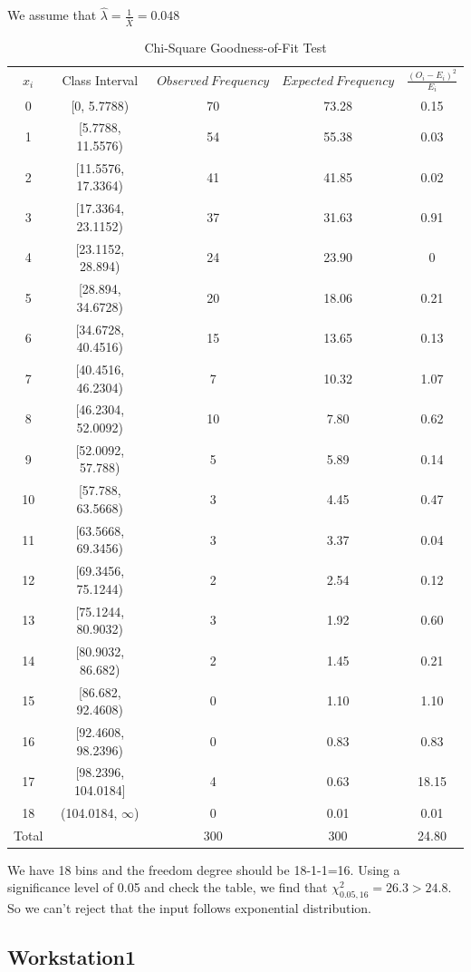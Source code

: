 \documentclass{article}
\begin{document}
We assume that $\hat{\lambda}=\frac{1}{\bar{X}}=0.048$
\begin{table}[htp]
\caption{Chi-Square Goodness-of-Fit Test}
\begin{center}
\begin{tabular}{ccccc}
\hline
$x_i$ & Class Interval & $Observed\ Frequency$ & $Expected\ Frequency$ & $\frac{(O_i-E_i)^2}{E_i}$\\
0&[0, 5.7788)&70&73.28&0.15\\
1&[5.7788, 11.5576)&54&55.38&0.03\\
2&[11.5576, 17.3364)&41&41.85&0.02\\
3&[17.3364, 23.1152)&37&31.63&0.91\\
4&[23.1152, 28.894)&24&23.90&0\\
5&[28.894, 34.6728)&20&18.06&0.21\\
6&[34.6728, 40.4516)&15&13.65&0.13\\
7&[40.4516, 46.2304)&7&10.32&1.07\\
8&[46.2304, 52.0092)&10&7.80&0.62\\
9&[52.0092, 57.788)&5&5.89&0.14\\
10&[57.788, 63.5668)&3&4.45&0.47\\
11&[63.5668, 69.3456)&3&3.37&0.04\\
12&[69.3456, 75.1244)&2&2.54&0.12\\
13&[75.1244, 80.9032)&3&1.92&0.60\\
14&[80.9032, 86.682)&2&1.45&0.21\\
15&[86.682, 92.4608)&0&1.10&1.10\\
16&[92.4608, 98.2396)&0&0.83&0.83\\
17&[98.2396, 104.0184]&4&0.63&18.15\\
18&(104.0184, $\infty$)&0&0.01&0.01\\
\hline
Total& &300&300&24.80\\

\hline

\end{tabular}
\end{center}
\label{default}
\end{table}%

We have 18 bins and the freedom degree should be 18-1-1=16. Using a significance level of 0.05 and check the table, we find that $\chi^2_{0.05, 16}=26.3 > 24.8$. So we can't reject that the input follows exponential distribution.



\subsection{Workstation1}
\end{document}
